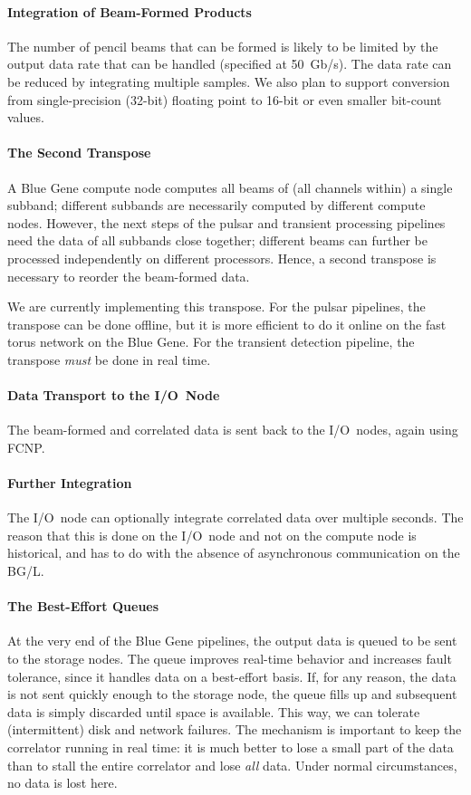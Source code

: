 \paragraph{Integration of Beam-Formed Products }
The number of pencil beams that can be formed is likely to be limited by the
output data rate that can be handled (specified at 50~Gb/s).
The data rate can be reduced by integrating multiple samples.
We also plan to support conversion from single-precision (32-bit) floating
point to 16-bit or even smaller bit-count values.


\paragraph{The Second Transpose }
A Blue Gene compute node computes all beams of (all channels within) a
single subband; different subbands are necessarily computed by different 
compute nodes.
However, the next steps of the pulsar and transient processing pipelines
need the data of all subbands close together; different beams can further be
processed independently on different processors.
Hence, a second transpose is necessary to reorder the beam-formed data.

We are currently implementing this transpose.
For the pulsar pipelines, the transpose can be done offline, but it is more
efficient to do it online on the fast torus network on the Blue Gene.
For the transient detection pipeline, the transpose \emph{must\/} be done
in real time.


\paragraph{Data Transport to the I/O~Node }
The beam-formed and correlated data is sent back to the I/O~nodes, again
using FCNP.

\paragraph{Further Integration }
The I/O~node can optionally integrate correlated data over multiple seconds.
The reason that this is done on the I/O~node and not on the compute node is
historical, and has to do with the absence of asynchronous communication
on the BG/L.


\paragraph{The Best-Effort Queues }
At the very end of the Blue Gene pipelines, the output data is queued to
be sent to the storage nodes.
The queue improves real-time behavior and increases fault tolerance, since
it handles data on a best-effort basis.
If, for any reason, the data is not sent quickly enough to the storage node,
the queue fills up and subsequent data is simply discarded until space is
available.
This way, we can tolerate (intermittent) disk and network failures.
The mechanism is important to keep the correlator running in real
time: it is much better to lose a small part of the data than to stall the
entire correlator and lose \emph{all\/} data.
Under normal circumstances, no data is lost here.


